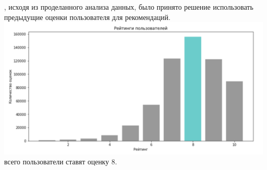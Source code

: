 \documentclass{article}
\newcommand\tab[1][1cm]{\hspace*{#1}}
\begin{document}
, исходя из проделанного анализа данных, было принято решение использовать предыдущие оценки пользователя для рекомендаций.\\
\includegraphics[scale=0.7]{f8.png}\\
 всего пользователи ставят оценку 8. 
\end{document}
